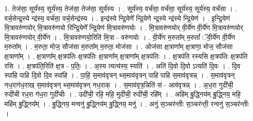 \documentclass[17pt]{extarticle}
\begin{document}
1. तेज॑सा॒ सूर्य॑स्य॒ सूर्य॑स्य॒ तेज॑सा॒ तेज॑सा॒ सूर्य॑स्य । . सूर्य॑स्य॒ वर्च॑सा॒ वर्च॑सा॒ सूर्य॑स्य॒ सूर्य॑स्य॒ वर्च॑सा । . वर्च॒सेन्द्र॒स्ये न्द्र॑स्य॒ वर्च॑सा॒ वर्च॒सेन्द्र॑स्य । . इन्द्र॑स्ये न्द्रि॒येणे᳚ न्द्रि॒येणे न्द्र॒स्ये न्द्र॑स्ये न्द्रि॒येण॑ । . इ॒न्द्रि॒येण॑ मि॒त्रावरु॑णयोर् मि॒त्रावरु॑णयो रिन्द्रि॒येणे᳚ न्द्रि॒येण॑ मि॒त्रावरु॑णयोः । . मि॒त्रावरु॑णयोर् वी॒र्ये॑ण वी॒र्ये॑ण मि॒त्रावरु॑णयोर् मि॒त्रावरु॑णयोर् वी॒र्ये॑ण । . मि॒त्रावरु॑णयो॒रिति॑ मि॒त्रा - वरु॑णयोः । . वी॒र्ये॑ण म॒रुता᳚म् म॒रुतां᳚ ॅवी॒र्ये॑ण वी॒र्ये॑ण म॒रुता᳚म् । . म॒रुता॒ मोज॒ सौज॑सा म॒रुता᳚म् म॒रुता॒ मोज॑सा । . ओज॑सा क्ष॒त्राणा᳚म् क्ष॒त्राणा॒ मोज॒ सौज॑सा क्ष॒त्राणा᳚म् । . क्ष॒त्राणा᳚म् क्ष॒त्रप॑तिः क्ष॒त्रप॑तिः क्ष॒त्राणा᳚म् क्ष॒त्राणा᳚म् क्ष॒त्रप॑तिः । . क्ष॒त्रप॑ति रस्यसि क्ष॒त्रप॑तिः क्ष॒त्रप॑ति रसि । . क्ष॒त्रप॑ति॒रिति॑ क्ष॒त्र - प॒तिः॒ । . अ॒स्य त्यत्य॑स्य॒ स्यति॑ । . अति॑ दि॒वो दि॒वो ऽत्यति॑ दि॒वः । . दि॒व स्पा॑हि पाहि दि॒वो दि॒व स्पा॑हि । . पा॒हि॒ स॒माव॑वृत्रन् थ्स॒माव॑वृत्रन् पाहि पाहि स॒माव॑वृत्रन्न् । . स॒माव॑वृत्रन् नध॒राग॑ध॒राख् स॒माव॑वृत्रन् थ्स॒माव॑वृत्रन् नध॒राक् । . स॒माव॑वृत्र॒न्निति॑ सं - आव॑वृत्रन्न् । . अ॒ध॒रा गुदी॑ची॒ रुदी॑ची रध॒रा ग॑ध॒रा गुदी॑चीः । . उदी॑ची॒ रहि॒ महि॒ मुदी॑ची॒ रुदी॑ची॒ रहि᳚म् । . अहि॑म् बु॒द्ध्निय॑म् बु॒द्ध्निय॒ महि॒ महि॑म् बु॒द्ध्निय᳚म् । . बु॒द्ध्निय॒ मन्वनु॑ बु॒द्ध्निय॑म् बु॒द्ध्निय॒ मनु॑ । . अनु॑ स॒ञ्चर॑न्तीः स॒ञ्चर॑न्ती॒ रन्वनु॑ स॒ञ्चर॑न्तीः । \newline
\end{document}
